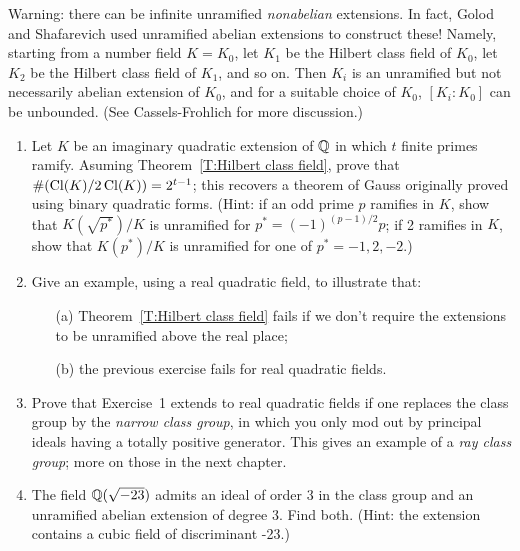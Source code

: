 Warning: there can be infinite unramified \emph{nonabelian} extensions.
In fact, Golod and Shafarevich used unramified abelian extensions to 
construct these! Namely, starting from a number field $K = K_0$,
let $K_1$ be the Hilbert class field of $K_0$, let $K_2$ be the Hilbert
class field of $K_1$, and so on. Then $K_i$ is an unramified but not
necessarily abelian extension of $K_0$, and for a suitable choice of 
$K_0$, $[K_i:K_0]$ can be unbounded. (See Cassels-Frohlich for more discussion.)


\begin{enumerate}
\item
Let $K$ be an imaginary
quadratic extension of $\mathbb{Q}$ in which $t$ finite primes ramify.
Asuming Theorem~\ref{T:Hilbert class field},
prove that $\#(\operatorname{Cl}(K)/2\operatorname{Cl}(K)) = 2^{t-1}$;
this recovers a theorem of Gauss originally proved using binary quadratic forms. 
(Hint: if an odd prime $p$
ramifies in $K$,
show that $K(\sqrt{p^*})/K$ is unramified for $p^* = (-1)^{(p-1)/2} p$; if 2 ramifies in $K$, show that
$K(p^*)/K$ is unramified for one of $p^* = -1, 2, -2$.)
\item
Give an example, using a real quadratic field, to illustrate that:
\begin{enumerate}
\item[(a)] Theorem~\ref{T:Hilbert class field} fails if we don't require the extensions to be
unramified above the real place;
\item[(b)] the previous exercise fails for real quadratic fields.
\end{enumerate}
\item
Prove that Exercise~1 extends to real quadratic fields if one replaces the
class group by the \emph{narrow class group}, in which you
only mod out by principal ideals having a totally positive generator.
This gives an example of a \emph{ray class group}; more on those in the next chapter.
\item
The field $\mathbb{Q}(\sqrt{-23})$ admits an ideal of order 3 in the class group and
an unramified
abelian extension of degree 3. Find both. (Hint: the extension contains a cubic field of discriminant -23.)
\end{enumerate}

%


